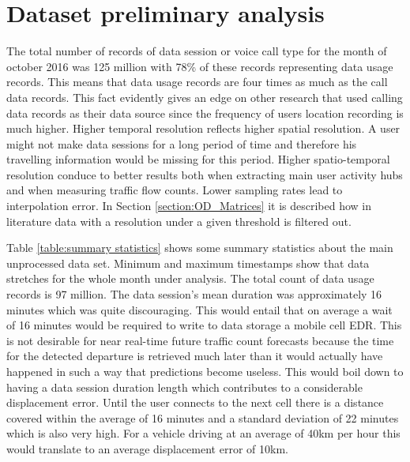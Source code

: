 \documentclass[12pt, a4paper]{report}
\theoremstyle{definition}
\theoremstyle{definition}%
\theoremstyle{definition}%
\theoremstyle{definition}%
\theoremstyle{definition}%
\theoremstyle{definition}%
\begin{document}
\section{Dataset preliminary analysis} \label{section:methodology:data_set_preliminary_analysis}

The total number of records of data session or voice call type for the month of october 2016 was 125 million with 78\% of these records representing data usage records. This means that data usage records are four times as much as the call data records. This fact evidently gives an edge on other research that used calling data records as their data source since the frequency of users location recording is much higher. Higher temporal resolution reflects higher spatial resolution. A user might not make data sessions for a long period of time and therefore his travelling information would be missing for this period.  Higher spatio-temporal resolution conduce to better results both when extracting main user activity hubs and when measuring traffic flow counts. Lower sampling rates lead to interpolation error. In Section \ref{section:OD_Matrices} it is described how in literature data with a resolution under a given threshold is filtered out.

Table \ref{table:summary statistics} shows some summary statistics about the main unprocessed data set. Minimum and maximum timestamps show that data stretches for the whole month under analysis. The total count of data usage records is 97 million. The data session's mean duration was approximately 16 minutes which was quite discouraging. This would entail that on average a wait of 16 minutes would be required to write to data storage a mobile cell EDR. This is not desirable for near real-time future traffic count forecasts because the time for the detected departure is retrieved much later than it would actually have happened in such a way that predictions become useless. This would boil down to having a data session duration length which contributes to a considerable displacement error. Until the user connects to the next cell there is a distance covered within the average of 16 minutes and a standard deviation of 22 minutes which is also very high. For a vehicle driving at an average of 40km per hour this would translate to an average displacement error of 10km. 
\end{document}
